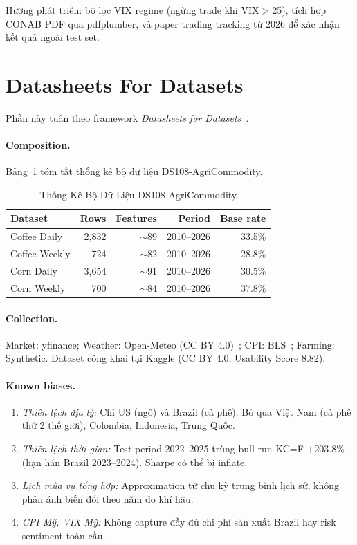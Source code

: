 \documentclass[conference]{IEEEtran}
\begin{document}
Hướng phát triển: bộ lọc VIX regime (ngừng trade khi VIX$>$25), tích hợp
CONAB PDF qua pdfplumber, và paper trading tracking từ 2026 để xác nhận
kết quả ngoài test set.

\section*{Datasheets For Datasets}

Phần này tuân theo framework \textit{Datasheets for Datasets}~\cite{gebru2021}.

\paragraph{Composition.}
Bảng~\ref{tab:dataset_stats} tóm tắt thống kê bộ dữ liệu DS108-AgriCommodity.
\begin{table}[H]
\caption{Thống Kê Bộ Dữ Liệu DS108-AgriCommodity}
\label{tab:dataset_stats}
\centering
\begin{tabular}{@{}lrrrr@{}}
\toprule
\textbf{Dataset} & \textbf{Rows} & \textbf{Features} & \textbf{Period} & \textbf{Base rate} \\
\midrule
Coffee Daily  & 2,832 & $\sim$89 & 2010--2026 & 33.5\% \\
Coffee Weekly & 724   & $\sim$82 & 2010--2026 & 28.8\% \\
Corn Daily    & 3,654 & $\sim$91 & 2010--2026 & 30.5\% \\
Corn Weekly   & 700   & $\sim$84 & 2010--2026 & 37.8\% \\
\bottomrule
\end{tabular}
\end{table}

\paragraph{Collection.}
Market: yfinance; Weather: Open-Meteo (CC BY 4.0)~\cite{zippenfenig2023};
CPI: BLS~\cite{bls2026}; Farming: Synthetic.
Dataset công khai tại Kaggle (CC BY 4.0, Usability Score 8.82).

\paragraph{Known biases.}
\begin{enumerate}
\item \textit{Thiên lệch địa lý:} Chỉ US (ngô) và Brazil (cà phê). Bỏ qua
Việt Nam (cà phê thứ 2 thế giới), Colombia, Indonesia, Trung Quốc.
\item \textit{Thiên lệch thời gian:} Test period 2022--2025 trùng bull run
KC=F $+$203.8\% (hạn hán Brazil 2023--2024). Sharpe có thể bị inflate.
\item \textit{Lịch mùa vụ tổng hợp:} Approximation từ chu kỳ trung bình
lịch sử, không phản ánh biến đổi theo năm do khí hậu.
\item \textit{CPI Mỹ, VIX Mỹ:} Không capture đầy đủ chi phí sản xuất Brazil
hay risk sentiment toàn cầu.
\end{enumerate}
\end{document}
